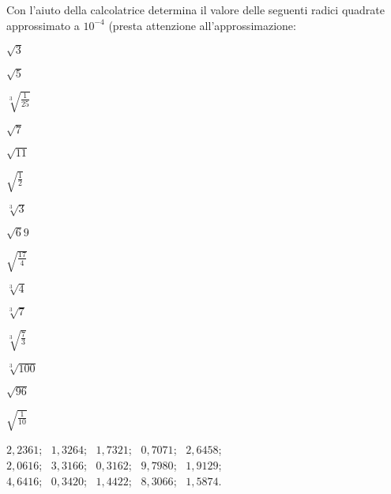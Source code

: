 \begin{esercizio}
\label{ese:2.03}
Con l'aiuto della calcolatrice determina il valore delle seguenti radici 
quadrate approssimato a \(10^{-4}\) (presta attenzione all'approssimazione:
\vspace{-.7em}
\begin{htmulticols}{5}
\begin{enumeratea}
\item \(\sqrt 3\)
\item \(\sqrt 5\)
\item \(\sqrt[3]{\frac{1}{25}}\)
\item \(\sqrt 7\)
\item \(\sqrt{11}\)
\item \(\sqrt{\frac 1 2}\)
\item \(\sqrt[3]3\)
\item \(\sqrt 69\)
\item \(\sqrt{\frac{17} 4}\)
\item \(\sqrt[3]4\)
\item \(\sqrt[3]7\)
\item \(\sqrt[3]{\frac{7}{3}}\)
\item \(\sqrt[3]{100}\)
\item \(\sqrt{96}\)
\item \(\sqrt{\frac{1}{10}}\)
\end{enumeratea}
\end{htmulticols}
\noindent\!\sframeop{~} \(2,2361\);~ 
\sframeop{~} \(1,3264\);~ 
\sframeop{~} \(1,7321\);~ 
\sframeop{~} \(0,7071\);~ 
\sframeop{~} \(2,6458\);~ \\
\sframeop{~} \(2,0616\);~ 
\sframeop{~} \(3,3166\);~ 
\sframeop{~} \(0,3162\);~ 
\sframeop{~} \(9,7980\);~ 
\sframeop{~} \(1,9129\);~ \\
\sframeop{~} \(4,6416\);~ 
\sframeop{~} \(0,3420\);~ 
\sframeop{~} \(1,4422\);~ 
\sframeop{~} \(8,3066\);~ 
\sframeop{~} \(1,5874\).~ 
\end{esercizio}


